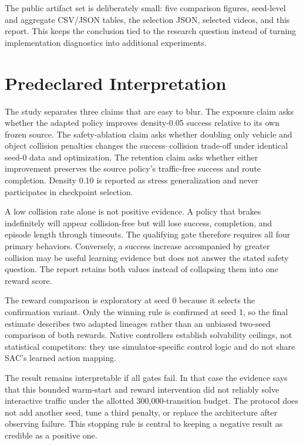 \documentclass[10pt,twocolumn]{article}
\begin{document}
The public artifact set is deliberately small: five comparison figures, seed-level and
aggregate CSV/JSON tables, the selection JSON, selected videos, and this report. This
keeps the conclusion tied to the research question instead of turning implementation
diagnostics into additional experiments.

\section{Predeclared Interpretation}
The study separates three claims that are easy to blur. The exposure claim asks whether
the adapted policy improves density-0.05 success relative to its own frozen source. The
safety-ablation claim asks whether doubling only vehicle and object collision penalties
changes the success--collision trade-off under identical seed-0 data and optimization.
The retention claim asks whether either improvement preserves the source policy's
traffic-free success and route completion. Density 0.10 is reported as stress
generalization and never participates in checkpoint selection.

A low collision rate alone is not positive evidence. A policy that brakes indefinitely
will appear collision-free but will lose success, completion, and episode length through
timeouts. The qualifying gate therefore requires all four primary behaviors. Conversely,
a success increase accompanied by greater collision may be useful learning evidence but
does not answer the stated safety question. The report retains both values instead of
collapsing them into one reward score.

The reward comparison is exploratory at seed 0 because it selects the confirmation
variant. Only the winning rule is confirmed at seed 1, so the final estimate describes
two adapted lineages rather than an unbiased two-seed comparison of both rewards. Native
controllers establish solvability ceilings, not statistical competitors: they use
simulator-specific control logic and do not share SAC's learned action mapping.

The result remains interpretable if all gates fail. In that case the evidence says that
this bounded warm-start and reward intervention did not reliably solve interactive
traffic under the allotted 300,000-transition budget. The protocol does not add another
seed, tune a third penalty, or replace the architecture after observing failure. This
stopping rule is central to keeping a negative result as credible as a positive one.
\end{document}
